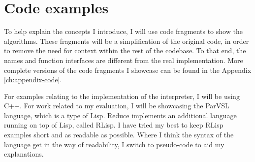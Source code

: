 \section{Code examples}

To help explain the concepts I introduce, I will use code fragments to show the algorithms.
These fragments will be a simplification of the original code, in order to remove the need
for context within the rest of the codebase. To that end, the names and function interfaces
are different from the real implementation. More complete versions of the code fragments
I showcase can be found in the Appendix \ref{ch:appendix-code}.

For examples relating to the implementation of the interpreter, I will be using C++.
For work related to my evaluation, I will be showcasing the ParVSL language, which is a type
of Lisp. Reduce implements an additional language running on top of Lisp, called RLisp.
I have tried my best to keep RLisp examples short and as readable
as possible. Where I think the syntax of the language get in the way of readability, I
switch to pseudo-code to aid my explanations.


